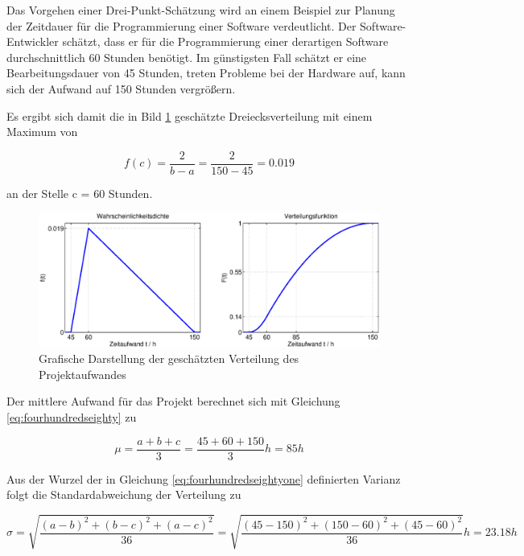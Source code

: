 \noindent Das Vorgehen einer Drei-Punkt-Sch\"{a}tzung wird an einem Beispiel zur Planung der Zeitdauer f\"{u}r die Programmierung einer Software verdeutlicht. Der Software-Entwickler sch\"{a}tzt, dass er f\"{u}r die Programmierung einer derartigen Software durchschnittlich 60 Stunden ben\"{o}tigt. Im g\"{u}nstigsten Fall sch\"{a}tzt er eine Bearbeitungsdauer von 45 Stunden, treten Probleme bei der Hardware auf, kann sich der Aufwand auf 150 Stunden vergr\"{o}{\ss}ern.

\noindent Es ergibt sich damit die in Bild \ref{fig:Stetig_Dreiecksverteilung_Projektaufwand} gesch\"{a}tzte Dreiecksverteilung mit einem Maximum von

\begin{equation}\label{eq:fourhundredseightytwo}
f(c)=\dfrac{2}{b-a} =\dfrac{2}{150-45} =0.019
\end{equation}

\noindent an der Stelle c = 60 Stunden.

\begin{figure}[H]
  \centerline{\includegraphics[width=1\textwidth]{Kapitel4/Bilder/image25}}
  \caption{Grafische Darstellung der gesch\"{a}tzten Verteilung des Projektaufwandes}
  \label{fig:Stetig_Dreiecksverteilung_Projektaufwand}
\end{figure}


\noindent Der mittlere Aufwand f\"{u}r das Projekt berechnet sich mit Gleichung \eqref{eq:fourhundredseighty} zu

\begin{equation}\label{eq:fourhundredseightythree}
\mu =\dfrac{a+b+c}{3} =\dfrac{45+60+150}{3} h=85 h
\end{equation}

\noindent Aus der Wurzel der in Gleichung \eqref{eq:fourhundredseightyone} definierten Varianz folgt die Standardabweichung der Verteilung zu

\begin{equation}\label{eq:fourhundredseightyfour}
\sigma =\sqrt{\dfrac{(a-b)^{2} +(b-c)^{2} +(a-c)^{2} }{36}} =\sqrt{\dfrac{(45-150)^{2} +(150-60)^{2} +(45-60)^{2} }{36}} h= 23.18 h
\end{equation}

